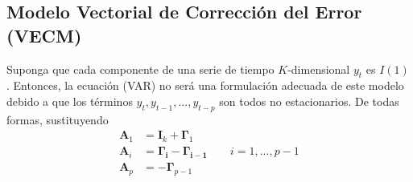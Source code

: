 \documentclass[12pt, twoside]{book}\usepackage[]{graphicx}\usepackage[]{color}
\let\bold\boldsymbol
\let\bf\mathbf
\numberwithin{equation}{section}
\numberwithin{theorem}{section}
\numberwithin{teorema}{section}
\numberwithin{defi}{section}
\numberwithin{prop}{section}
\numberwithin{defi}{section}
\theoremstyle{plain}
\begin{document}
\subsection{Modelo Vectorial de Corrección del Error (VECM)}
Suponga que  cada componente de una serie de tiempo $K$-dimensional $y_{t}$ es $I(1)$. Entonces, la ecuación (VAR) no será una formulación adecuada de este modelo debido a que los términos $y_{t},y_{t-1},...,y_{t-p}$ son todos no estacionarios. De todas formas, sustituyendo 
\begin{align}
\bf{A}_{1} & = \bf{I}_{k}+\bold{\Gamma}_{1} \\ 
\bf{A}_{i} & = \bold{\Gamma_{i}}-\bold{\Gamma_{i-1}} \qquad i=1,...,p-1 \\ 
\bf{A}_{p} & = -\bold{\Gamma}_{p-1}
\end{align}
\end{document}
